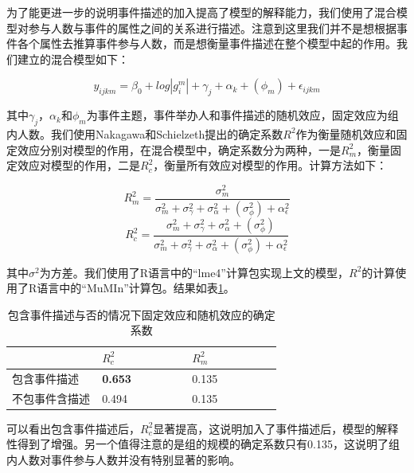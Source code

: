 \documentclass[12pt]{template}
\begin{document}
为了能更进一步的说明事件描述的加入提高了模型的解释能力，我们使用了混合模型对参与人数与事件的属性之间的关系进行描述。注意到这里我们并不是想根据事件各个属性去推算事件参与人数，而是想衡量事件描述在整个模型中起的作用。我们建立的混合模型如下：

\begin{equation}
y_{ijkm}=\beta_0+log|g_i^m|+\gamma_j+\alpha_k+ (\phi_m) +\epsilon_{ijkm}
\end{equation}

其中\(\gamma_j\)，\(\alpha_k\)和\(\phi_m\)为事件主题，事件举办人和事件描述的随机效应，固定效应为组内人数。我们使用Nakagawa和Schielzeth\citep{nakagawa_ageneralandsimplemethodforobtaining_2013}提出的确定系数\(R^2\)作为衡量随机效应和固定效应分别对模型的作用，在混合模型中，确定系数分为两种，一是\(R_m^2\)，衡量固定效应对模型的作用，二是\(R_c^2\)，衡量所有效应对模型的作用。计算方法如下：

\begin{equation}
R_m^2=\frac{\sigma_m^2}{\sigma_m^2+\sigma_\gamma^2+\sigma_\alpha^2+(\sigma_\phi^2)+\alpha_\epsilon^2}
\end{equation}
\begin{equation}
R_c^2=\frac{\sigma_m^2+\sigma_\gamma^2+\sigma_\alpha^2+(\sigma_\phi^2)}{\sigma_m^2+\sigma_\gamma^2+\sigma_\alpha^2+(\sigma_\phi^2)+\alpha_\epsilon^2}
\end{equation}

其中\(\sigma^2\)为方差。我们使用了R语言中的``lme4''计算包\citep{lme4}实现上文的模型，\(R^2\)的计算使用了R语言中的``MuMIn''计算包\citep{MuMIn}。结果如表\ref{t1-4}。



\begin{table}[h]
  \caption{\label{t1-4}包含事件描述与否的情况下固定效应和随机效应的确定系数}
	\centering  
    \begin{tabular*}{\linewidth}{p{0.33\linewidth}p{0.33\linewidth}p{0.33\linewidth}}
  \toprule
    &  \(R_c^2\) & \(R_m^2\) \\ 
  \midrule
		包含事件描述                       & \textbf{0.653} & 0.135 \\ 
    不包事件含描述                        & 0.494 & 0.135 \\ 
  \bottomrule
    \end{tabular*}
\end{table}

可以看出包含事件描述后，\(R_c^2\)显著提高，这说明加入了事件描述后，模型的解释性得到了增强。另一个值得注意的是组的规模的确定系数只有0.135，这说明了组内人数对事件参与人数并没有特别显著的影响。
\end{document}
